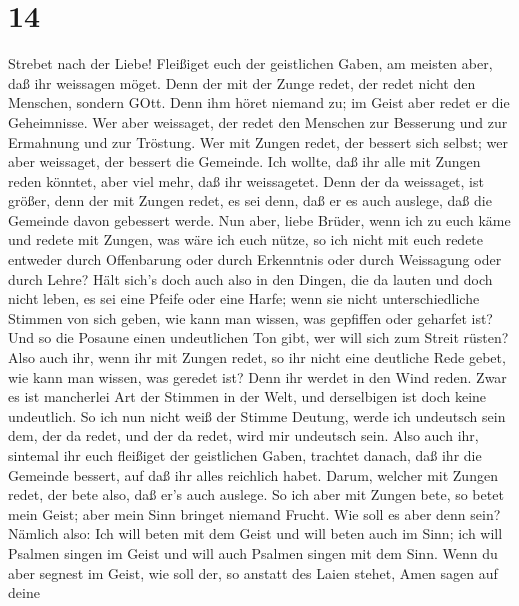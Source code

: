 \hypertarget{section-13}{%
\section{14}\label{section-13}}

 Strebet nach der Liebe! Fleißiget euch der geistlichen
Gaben, am meisten aber, daß ihr weissagen möget.  Denn der
mit der Zunge redet, der redet nicht den Menschen, sondern GOtt. Denn
ihm höret niemand zu; im Geist aber redet er die Geheimnisse.
 Wer aber weissaget, der redet den Menschen zur Besserung
und zur Ermahnung und zur Tröstung.  Wer mit Zungen redet,
der bessert sich selbst; wer aber weissaget, der bessert die Gemeinde.
 Ich wollte, daß ihr alle mit Zungen reden könntet, aber
viel mehr, daß ihr weissagetet. Denn der da weissaget, ist größer, denn
der mit Zungen redet, es sei denn, daß er es auch auslege, daß die
Gemeinde davon gebessert werde.  Nun aber, liebe Brüder,
wenn ich zu euch käme und redete mit Zungen, was wäre ich euch nütze, so
ich nicht mit euch redete entweder durch Offenbarung oder durch
Erkenntnis oder durch Weissagung oder durch Lehre?  Hält
sich's doch auch also in den Dingen, die da lauten und doch nicht leben,
es sei eine Pfeife oder eine Harfe; wenn sie nicht unterschiedliche
Stimmen von sich geben, wie kann man wissen, was gepfiffen oder geharfet
ist?  Und so die Posaune einen undeutlichen Ton gibt, wer
will sich zum Streit rüsten?  Also auch ihr, wenn ihr mit
Zungen redet, so ihr nicht eine deutliche Rede gebet, wie kann man
wissen, was geredet ist? Denn ihr werdet in den Wind reden.
 Zwar es ist mancherlei Art der Stimmen in der Welt, und
derselbigen ist doch keine undeutlich.  So ich nun nicht
weiß der Stimme Deutung, werde ich undeutsch sein dem, der da redet, und
der da redet, wird mir undeutsch sein.  Also auch ihr,
sintemal ihr euch fleißiget der geistlichen Gaben, trachtet danach, daß
ihr die Gemeinde bessert, auf daß ihr alles reichlich habet.
 Darum, welcher mit Zungen redet, der bete also, daß er's
auch auslege.  So ich aber mit Zungen bete, so betet mein
Geist; aber mein Sinn bringet niemand Frucht.  Wie soll es
aber denn sein? Nämlich also: Ich will beten mit dem Geist und will
beten auch im Sinn; ich will Psalmen singen im Geist und will auch
Psalmen singen mit dem Sinn.  Wenn du aber segnest im
Geist, wie soll der, so anstatt des Laien stehet, Amen sagen auf deine
